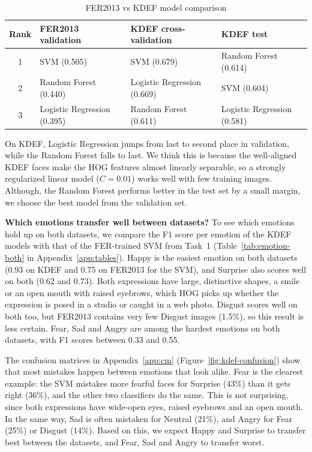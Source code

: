 \begin{table}[h]\centering\small
\begin{tabular}{@{}clll@{}}\toprule
Rank & FER2013 validation & KDEF cross-validation & KDEF test \\\midrule
1 & SVM (0.505) & SVM (0.679) & Random Forest (0.614) \\
2 & Random Forest (0.440) & Logistic Regression (0.669) & SVM (0.604) \\
3 & Logistic Regression (0.395) & Random Forest (0.611) & Logistic Regression (0.581) \\
\bottomrule\end{tabular}
\caption{FER2013 vs KDEF model comparison}
\label{tab:kdef-model-ranking-comparison}
\end{table}

On KDEF, Logistic Regression jumps from last to second place in validation, while the Random Forest falls to last. We think this is because the well-aligned KDEF faces make the HOG features almost linearly separable, so a strongly regularized linear model ($C=0.01$) works well with few training images. Although, the Random Forest performs better in the test set by a small margin, we choose the best model from the validation set.


\textbf{Which emotions transfer well between datasets?} To see which emotions hold up on both datasets, we compare the F1 score per emotion of the KDEF models with that of the FER-trained SVM from Task~1 (Table~\ref{tab:emotion-both} in Appendix~\ref{app:tables}). Happy is the easiest emotion on both datasets (0.93 on KDEF and 0.75 on FER2013 for the SVM), and Surprise also scores well on both (0.62 and 0.73). Both expressions have large, distinctive shapes, a smile or an open mouth with raised eyebrows, which HOG picks up whether the expression is posed in a studio or caught in a web photo. Disgust scores well on both too, but FER2013 contains very few Disgust images (1.5\%), so this result is less certain. Fear, Sad and Angry are among the hardest emotions on both datasets, with F1 scores between 0.33 and 0.55.

The confusion matrices in Appendix~\ref{app:cm} (Figure~\ref{fig:kdef-confusion}) show that most mistakes happen between emotions that look alike. Fear is the clearest example: the SVM mistakes more fearful faces for Surprise (43\%) than it gets right (36\%), and the other two classifiers do the same. This is not surprising, since both expressions have wide-open eyes, raised eyebrows and an open mouth. In the same way, Sad is often mistaken for Neutral (21\%), and Angry for Fear (25\%) or Disgust (14\%). Based on this, we expect Happy and Surprise to transfer best between the datasets, and Fear, Sad and Angry to transfer worst.
